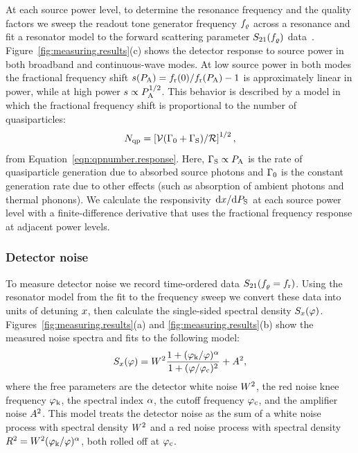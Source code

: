 At each source power level, to determine the resonance frequency and the quality factors we sweep the readout tone generator frequency $f_\varrho$ across a resonance and fit a resonator model to the forward scattering parameter $S_{21}(f_\varrho)$ data~\autocite{McCarrick2014RSI}.
Figure~\ref{fig:measuring.results}(c) shows the detector response to source power in both broadband and continuous-wave modes.
At low source power in both modes the fractional frequency shift
$s(P_{\mathrm{A}}) = f_{\mathrm{r}}(0) / f_{\mathrm{r}}(P_{\mathrm{A}}) - 1$ is approximately linear in power, while at high power $s \propto P_{\mathrm{A}}^{1/2}$.
This behavior is described by a model in which the fractional frequency shift is proportional to the number of quasiparticles:
\begin{equation}
N_{\mathrm{qp}}
  =
  \left[ \mathcal{V} (\Gamma_0 + \Gamma_{\mathrm{S}}) / \mathcal{R} \right]^{1/2},
\end{equation}
from Equation~\ref{eqn:qpnumber.response}.
Here, $\Gamma_{\mathrm{S}} \propto P_{\mathrm{A}}$ is the rate of quasiparticle generation due to absorbed source photons and $\Gamma_0$ is the constant generation rate due to other effects (such as absorption of ambient photons and thermal phonons).
We calculate the responsivity $\dv*{x}{P_{\mathrm{S}}}$ at each source power level with a finite-difference derivative that uses the fractional frequency response at adjacent power levels.


\subsubsection{Detector noise}

To measure detector noise we record time-ordered data $S_{21}(f_\varrho = f_{\mathrm{r}})$.
Using the resonator model from the fit to the frequency sweep we convert these data into units of detuning $x$, then calculate the single-sided spectral density $S_{x}(\varphi)$.
Figures~\ref{fig:measuring.results}(a) and \ref{fig:measuring.results}(b) show the measured noise spectra and fits to the following model:
\begin{equation}
\label{eqn:noise_model}
S_{x}(\varphi)
  =
  W^2 \frac{1 + (\varphi_{\mathrm{k}} / \varphi)^\alpha}{1 + (\varphi / \varphi_{\mathrm{c}})^2} + A^2,
\end{equation}
where the free parameters are the detector white noise $W^2$, the red noise knee frequency $\varphi_{\mathrm{k}}$, the spectral index $\alpha$, the cutoff frequency $\varphi_{\mathrm{c}}$, and the amplifier noise $A^2$.
This model treats the detector noise as the sum of a white noise process with spectral density $W^2$ and a red noise process with spectral density $R^2 = W^2 (\varphi_{\mathrm{k}} / \varphi)^\alpha$, both rolled off at $\varphi_{\mathrm{c}}$.


